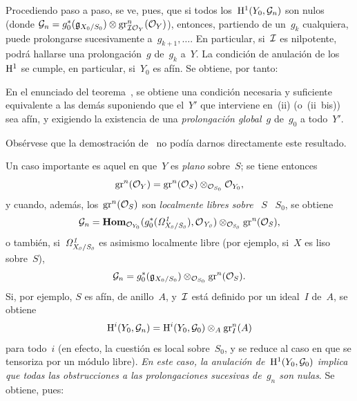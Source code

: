 
Procediendo paso a paso, se ve, pues, que si todos los~$\H^1(Y_0,\cal{G}_n)$
son nulos (donde $\cal{G}_n=g_0^*(\goth{g}_{X_0/S_0})\otimes\gr_{\cal{IO}_Y}^{n}(\cal{O}_Y)$), entonces, partiendo de un~$g_k$ cualquiera, puede prolongarse sucesivamente a~$g_{k+1},\dots$. En particular, si~$\cal{I}$ es nilpotente, podrá hallarse una prolongación~$g$ de~$g_k$ a~$Y$. La condición de anulación de los~$\H^1$ se cumple, en particular, si~$Y_0$ es afín. Se obtiene, por tanto:

\begin{corollaire}
\label{III.5.5}
En
el enunciado del teorema~, se obtiene una condición necesaria y suficiente equivalente a las demás suponiendo que el~$Y'$ que interviene en~\textup{(ii)} (o~\textup{(ii~bis)}) sea afín, y exigiendo la existencia de una \emph{prolongación global}~$g$ de~$g_0$ a todo~$Y'$.
\end{corollaire}

Obsérvese que la demostración de~ no podía darnos directamente este resultado.

Un caso importante es aquel en que~$Y$ es \emph{plano} sobre~$S$; se tiene entonces
\begin{equation*}
\gr^n(\cal{O}_Y)=\gr^n(\cal{O}_S)\otimes_{\cal{O}_{S_0}}\cal{O}_{Y_0},
\end{equation*}
y cuando, además, los~$\gr^n(\cal{O}_S)$ son \emph{localmente libres sobre}
{~$S$}
{~$S_0$},
se obtiene
\begin{equation*}
\cal{G}_n=
\SheafHom_{\cal{O}_{Y_0}}(g_0^*(\it{\Omega}_{X_0/S_0}^1),\cal{O}_{Y_0})
\otimes_{\cal{O}_{S_0}}\gr^n(\cal{O}_S),
\end{equation*}
o también, si~$\it{\Omega}_{X_0/S_0}^1$ es asimismo localmente libre (por ejemplo, si~$X$ es liso sobre~$S$),
\begin{equation*}
\cal{G}_n=g_0^*(\goth{g}_{X_0/S_0})
\otimes_{\cal{O}_{S_0}}\gr^n(\cal{O}_S).
\end{equation*}
Si, por ejemplo, $S$ es afín,
de anillo~$A$, y~$\cal{I}$ está definido por un ideal~$I$ de~$A$, se obtiene
\begin{equation*}
\H^i(Y_0,\cal{G}_n)=\H^i(Y_0,\cal{G}_0)\otimes_A\gr_I^n(A)
\end{equation*}
para todo~$i$ (en efecto, la cuestión es local sobre~$S_0$, y se reduce al caso en que se tensoriza por un módulo libre). \emph{En este caso, la anulación de~$\H^1(Y_0,\cal{G}_0)$ implica que todas las obstrucciones a las prolongaciones sucesivas de~$g_n$ son nulas}. Se obtiene, pues:

